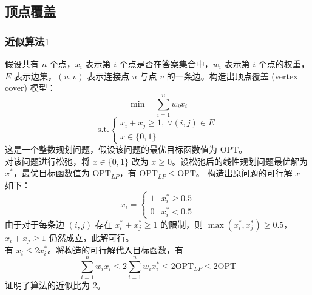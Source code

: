 \subsection{顶点覆盖}
\subsubsection{近似算法$1$}
假设共有 $n$ 个点，$x_i$ 表示第 $i$ 个点是否在答案集合中，$w_i$ 表示第 $i$ 个点的权重，$E$ 表示边集，$(u, v)$ 表示连接点 $u$ 与点 $v$ 的一条边。构造出顶点覆盖 (vertex cover) 模型：
$$
\min \quad \sum_{i = 1}^n w_ix_i
$$
$$
\text{s.t.} 
\begin{cases}
    x_i + x_j \ge 1, \ \forall (i, j) \in E \\
    x \in \{0, 1\}
\end{cases}
$$
这是一个整数规划问题，假设该问题的最优目标函数值为 $\text{OPT}$。 \\
对该问题进行松弛，将 $x \in \{0, 1\}$ 改为 $x \ge 0$。设松弛后的线性规划问题最优解为 $x^*$，最优目标函数值为 $\text{OPT}_{LP}$，有 $\text{OPT}_{LP} \le \text{OPT}$。
构造出原问题的可行解 $x$ 如下：
$$
x_i = \begin{cases} 1 & x^*_i \ge 0.5 \\ 0 & x^*_i < 0.5 \end{cases}
$$ 
由于对于每条边 $(i, j)$ 存在 $x^*_i + x^*_j \ge 1$ 的限制，则 $\max(x^*_i, x^*_j) \ge 0.5$，$x_i + x_j \ge 1$ 仍然成立，此解可行。 \\
有 $x_i \le 2x^*_i$。将构造的可行解代入目标函数，有
$$
\sum_{i=1}^n w_ix_i \le 2\sum_{i=1}^n w_ix^*_i \le 2\text{OPT}_{LP} \le 2\text{OPT}
$$
证明了算法的近似比为 $2$。

